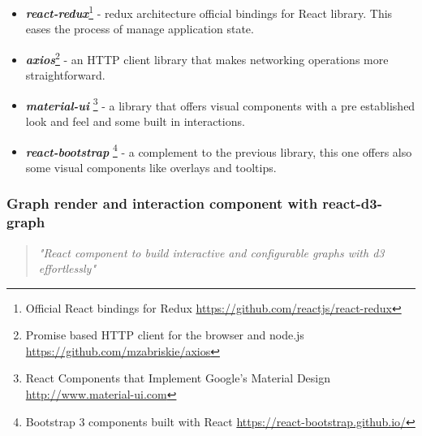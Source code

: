 \begin{itemize}
    \item \textit{\textbf{react-redux}}\footnote{Official React bindings for Redux \url{https://github.com/reactjs/react-redux}} - redux architecture official bindings for React library. This eases the process of manage application state.
    \item \textit{\textbf{axios}}\footnote{Promise based HTTP client for the browser and node.js \url{https://github.com/mzabriskie/axios}} - an HTTP client library that makes networking operations more straightforward.
    \item \textit{\textbf{material-ui}} \footnote{React Components that Implement Google's Material Design \url{http://www.material-ui.com}} - a library that offers visual components with a pre established look and feel and some built in interactions.
    \item \textit{\textbf{react-bootstrap}} \footnote{Bootstrap 3 components built with React \url{https://react-bootstrap.github.io/}} - a complement to the previous library, this one offers also some visual components like overlays and tooltips.
\end{itemize}

\subsubsection{Graph render and interaction component with react-d3-graph}

\begin{quote}
\textit{"React component to build interactive and configurable graphs with d3 effortlessly"}
\end{quote}

